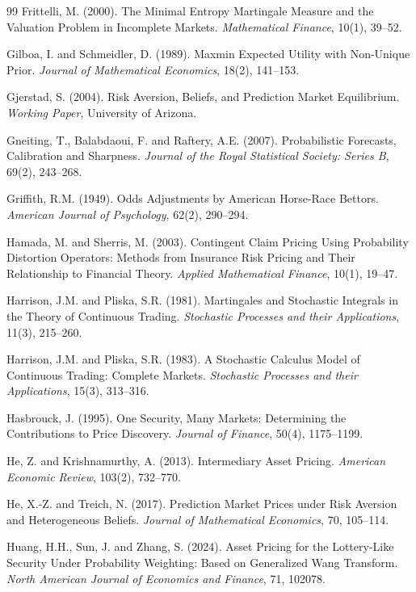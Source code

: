 \documentclass[12pt,a4paper]{article}
\begin{document}
\begin{thebibliography}{99}
 Frittelli, M. (2000). The Minimal Entropy Martingale Measure and the
  Valuation Problem in Incomplete Markets. \emph{Mathematical Finance},
  10(1), 39--52.

 Gilboa, I. and Schmeidler, D. (1989). Maxmin Expected Utility with
  Non-Unique Prior. \emph{Journal of Mathematical Economics}, 18(2),
  141--153.

 Gjerstad, S. (2004). Risk Aversion, Beliefs, and Prediction Market
  Equilibrium. \emph{Working Paper}, University of Arizona.

 Gneiting, T., Balabdaoui, F. and Raftery, A.E. (2007). Probabilistic
  Forecasts, Calibration and Sharpness. \emph{Journal of the Royal
  Statistical Society: Series B}, 69(2), 243--268.

 Griffith, R.M. (1949). Odds Adjustments by American Horse-Race
  Bettors. \emph{American Journal of Psychology}, 62(2), 290--294.

 Hamada, M. and Sherris, M. (2003). Contingent Claim Pricing Using
  Probability Distortion Operators: Methods from Insurance Risk Pricing
  and Their Relationship to Financial Theory. \emph{Applied Mathematical
  Finance}, 10(1), 19--47.

 Harrison, J.M. and Pliska, S.R. (1981). Martingales and Stochastic
  Integrals in the Theory of Continuous Trading. \emph{Stochastic
  Processes and their Applications}, 11(3), 215--260.

 Harrison, J.M. and Pliska, S.R. (1983). A Stochastic Calculus Model of
  Continuous Trading: Complete Markets. \emph{Stochastic Processes and
  their Applications}, 15(3), 313--316.

 Hasbrouck, J. (1995). One Security, Many Markets: Determining the
  Contributions to Price Discovery. \emph{Journal of Finance}, 50(4),
  1175--1199.

 He, Z. and Krishnamurthy, A. (2013). Intermediary Asset Pricing.
  \emph{American Economic Review}, 103(2), 732--770.

 He, X.-Z. and Treich, N. (2017). Prediction Market Prices under Risk
  Aversion and Heterogeneous Beliefs. \emph{Journal of Mathematical
  Economics}, 70, 105--114.

 Huang, H.H., Sun, J. and Zhang, S. (2024). Asset Pricing for the
  Lottery-Like Security Under Probability Weighting: Based on
  Generalized Wang Transform. \emph{North American Journal of Economics
  and Finance}, 71, 102078.


\end{thebibliography}
\end{document}
